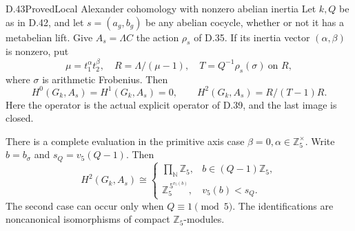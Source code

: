 \begin{statement}{D.43}{Proved}{Local Alexander cohomology with nonzero abelian inertia}
Let \(k,Q\) be as in D.42, and let \(s=(a_g,b_g)\)
be any abelian cocycle, whether or not it has a
metabelian lift. Give \(A_s=\Lambda C\) the action
\(\rho_s\) of D.35. If its inertia vector
\((\alpha,\beta)\) is nonzero, put
\[
 \mu=t_1^\alpha t_2^\beta,\quad
 R=\Lambda/(\mu-1),\quad
 T=Q^{-1}\rho_s(\sigma)\ \text{on }R,
\]
where \(\sigma\) is arithmetic Frobenius. Then
\[
 H^0(G_k,A_s)=H^1(G_k,A_s)=0,\qquad
 H^2(G_k,A_s)=R/(T-1)R.                                \tag{D.43.1}
\]
Here the operator is the actual explicit operator
of D.39, and the last image is closed.

There is a complete evaluation in the primitive
axis case \(\beta=0,\alpha\in\mathbb Z_5^\times\).
Write \(b=b_\sigma\) and \(s_Q=v_5(Q-1)\). Then
\[
 H^2(G_k,A_s)\cong
 \begin{cases}
    \displaystyle\prod_{\mathbb N}\mathbb Z_5,
                        &b\in(Q-1)\mathbb Z_5,\\
    \mathbb Z_5^{\,5^{v_5(b)}},
                        &v_5(b)<s_Q.
 \end{cases}                                           \tag{D.43.2}
\]
The second case can occur only when \(Q\equiv1\pmod5\).
The identifications are noncanonical isomorphisms
of compact \(\mathbb Z_5\)-modules.
\end{statement}
